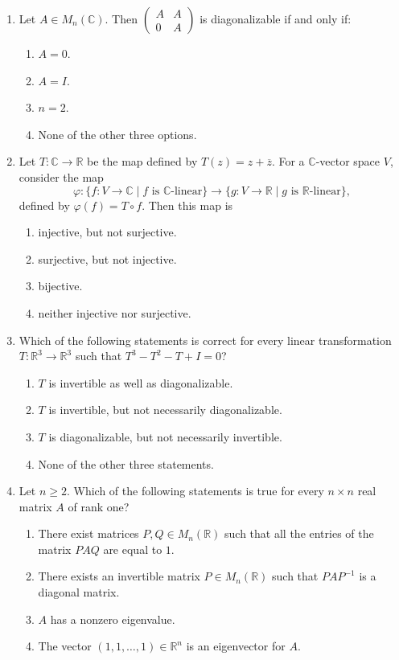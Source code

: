 \documentclass[11pt, a4paper]{article}
\begin{document}
\begin{enumerate}
  \item Let $A \in M_n(\mathbb{C})$. Then $\begin{pmatrix} A & A \\ 0 & A \end{pmatrix}$ is diagonalizable if and only if:
  \begin{enumerate}[label=(\alph*)]
    \item $A = 0$.
    \item $A = I$.
    \item $n = 2$.
    \item None of the other three options.
  \end{enumerate}

  \item Let $T: \mathbb{C} \to \mathbb{R}$ be the map defined by $T(z) = z + \overline{z}$. For a $\mathbb{C}$-vector space $V$, consider the map
  \[
    \varphi: \{f: V \to \mathbb{C} \mid f \text{ is } \mathbb{C}\text{-linear}\} \to \{g: V \to \mathbb{R} \mid g \text{ is } \mathbb{R}\text{-linear}\},
  \]
  defined by $\varphi(f) = T \circ f$. Then this map is
  \begin{enumerate}[label=(\alph*)]
    \item injective, but not surjective.
    \item surjective, but not injective.
    \item bijective.
    \item neither injective nor surjective.
  \end{enumerate}

  \item Which of the following statements is correct for every linear transformation $T: \mathbb{R}^3 \to \mathbb{R}^3$ such that $T^3 - T^2 - T + I = 0$?
  \begin{enumerate}[label=(\alph*)]
    \item $T$ is invertible as well as diagonalizable.
    \item $T$ is invertible, but not necessarily diagonalizable.
    \item $T$ is diagonalizable, but not necessarily invertible.
    \item None of the other three statements.
  \end{enumerate}

  \item Let $n \ge 2$. Which of the following statements is true for every $n \times n$ real matrix $A$ of rank one?
  \begin{enumerate}[label=(\alph*)]
    \item There exist matrices $P, Q \in M_n(\mathbb{R})$ such that all the entries of the matrix $PAQ$ are equal to $1$.
    \item There exists an invertible matrix $P \in M_n(\mathbb{R})$ such that $PAP^{-1}$ is a diagonal matrix.
    \item $A$ has a nonzero eigenvalue.
    \item The vector $(1, 1, \dots, 1) \in \mathbb{R}^n$ is an eigenvector for $A$.
  \end{enumerate}


\end{enumerate}
\end{document}
